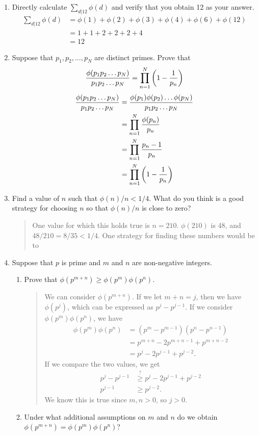 \documentclass{hw}
\begin{document}

\begin{enumerate}
\item Directly calculate $\displaystyle\sum\limits_{d|12}\phi(d)$ and verify that you obtain 12 as your
answer.
\begin{align*}
\sum_{d|12}\phi(d) &= \phi(1) + \phi(2) + \phi(3) + \phi(4) + \phi(6) + \phi(12)\\
&= 1 + 1 + 2 + 2 + 2 + 4\\
&= 12
\end{align*}

\item Suppose that $p_{1},p_{2},\dots,p_{N}$ are distinct primes. Prove that
\[
{\phi(p_{1}p_{2}\dots p_{N}) \over p_{1}p_{2}\dots p_{N}}
=
\prod_{n=1}^{N}\left(1-{1\over p_{n}}\right)
\]
\begin{align*}
{\phi(p_{1}p_{2}\dots p_{N}) \over p_{1}p_{2}\dots p_{N}} &=
{\phi(p_{1})\phi(p_{2})\dots \phi(p_{N}) \over p_{1}p_{2}\dots p_{N}}\\
&= \prod_{n=1}^{N}{\phi(p_{n})\over p_{n}}\\
&= \prod_{n=1}^{N}{p_{n} -1 \over p_{n}}\\
&= \prod_{n=1}^{N}\left(1-{1\over p_{n}}\right)
\end{align*}

\item Find a value of $n$ such that $\phi(n)/n < 1/4$. What do you think is a good strategy for
choosing $n$ so that $\phi(n)/n$ is close to zero?
\begin{quote}
One value for which this holds true is $n=210$. $\phi(210)$ is 48, and $48/210 = 8/35 < 1/4$. One
strategy for finding these numbers would be to
\end{quote}

\item Suppose that $p$ is prime and $m$ and $n$ are non-negative integers.
\begin{enumerate}
\item Prove that $\phi(p^{m+n})\geq\phi(p^{m})\phi(p^{n})$.
\begin{quote}
We can consider $\phi(p^{m+n})$. If we let $m+n=j$, then we have $\phi(p^{j})$, which can be
expressed as $p^{j}-p^{j-1}$. If we consider $\phi(p^{m})\phi(p^{n})$, we have
\begin{align*}
\phi(p^{m})\phi(p^{n})&= (p^{m}-p^{m-1})(p^{n}-p^{n-1})\\
&= p^{m+n} - 2p^{m+n-1} + p^{m+n-2}\\
&= p^{j}-2p^{j-1}+p^{j-2}.
\end{align*}
If we compare the two values, we get
\begin{align*}
p^{j}-p^{j-1} &\stackrel{?}{\geq} p^{j}-2p^{j-1}+p^{j-2}\\
p^{j-1} &\geq p^{j-2}.
\end{align*}
We know this is true since $m,n>0$, so $j>0$.
\end{quote}

\item Under what additional assumptions on $m$ and $n$ do we obtain
$\phi(p^{m+n})=\phi(p^{m})\phi(p^{n})$?
\end{enumerate}


\end{enumerate}
\end{document}
